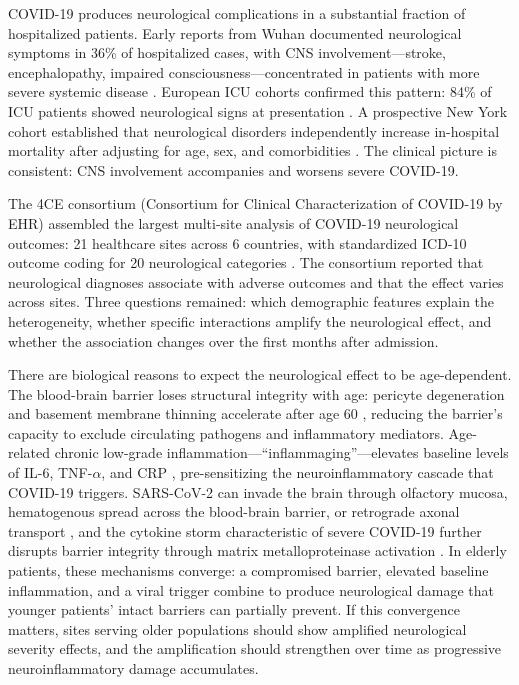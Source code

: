\documentclass{article}
\begin{document}
COVID-19 produces neurological complications in a substantial fraction of hospitalized patients.
Early reports from Wuhan documented neurological symptoms in 36\% of hospitalized cases, with CNS involvement---stroke, encephalopathy, impaired consciousness---concentrated in patients with more severe systemic disease \cite{mao2020neuro}.
European ICU cohorts confirmed this pattern: 84\% of ICU patients showed neurological signs at presentation \cite{helms2020neuro}.
A prospective New York cohort established that neurological disorders independently increase in-hospital mortality after adjusting for age, sex, and comorbidities \cite{frontera2021neuro}.
The clinical picture is consistent: CNS involvement accompanies and worsens severe COVID-19.

The 4CE consortium (Consortium for Clinical Characterization of COVID-19 by EHR) assembled the largest multi-site analysis of COVID-19 neurological outcomes: 21 healthcare sites across 6 countries, with standardized ICD-10 outcome coding for 20 neurological categories \cite{four_ce_neuro2021}.
The consortium reported that neurological diagnoses associate with adverse outcomes and that the effect varies across sites.
Three questions remained: which demographic features explain the heterogeneity, whether specific interactions amplify the neurological effect, and whether the association changes over the first months after admission.

There are biological reasons to expect the neurological effect to be age-dependent.
The blood-brain barrier loses structural integrity with age: pericyte degeneration and basement membrane thinning accelerate after age 60 \cite{montagne2015bbb}, reducing the barrier's capacity to exclude circulating pathogens and inflammatory mediators.
Age-related chronic low-grade inflammation---``inflammaging''---elevates baseline levels of IL-6, TNF-$\alpha$, and CRP \cite{franceschi2018inflammaging}, pre-sensitizing the neuroinflammatory cascade that COVID-19 triggers.
SARS-CoV-2 can invade the brain through olfactory mucosa, hematogenous spread across the blood-brain barrier, or retrograde axonal transport \cite{song2021neuroinvasion}, and the cytokine storm characteristic of severe COVID-19 further disrupts barrier integrity through matrix metalloproteinase activation \cite{iadecola2020covid}.
In elderly patients, these mechanisms converge: a compromised barrier, elevated baseline inflammation, and a viral trigger combine to produce neurological damage that younger patients' intact barriers can partially prevent.
If this convergence matters, sites serving older populations should show amplified neurological severity effects, and the amplification should strengthen over time as progressive neuroinflammatory damage accumulates.
\end{document}
